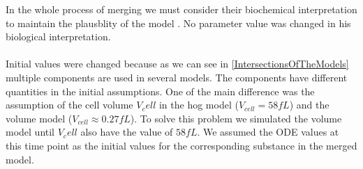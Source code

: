 In the whole process of merging we must consider their biochemical interpretation to maintain the plausblity of the model \cite{Liebermeister2008ValidityAC}. No parameter value was changed in his biological interpretation.\\\\

Initial values were changed because as we can see in \ref{IntersectionsOfTheModels} multiple components are used in several models. The components have different quantities in the initial assumptions. One of the main difference was the assumption of the cell volume $V_cell$ in the hog model ($V_{cell}=58fL $) and the volume model ($V_{cell} \approx 0.27fL$). To solve this problem we simulated the volume model until $V_cell$ also have the value of $58fL$. We assumed the ODE values at this time point as the initial values for the corresponding substance in the merged model. \\\\

